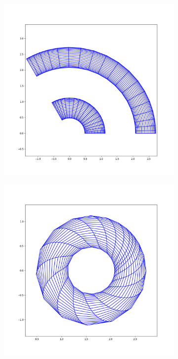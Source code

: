 \begin{figure}[H]
	\centering
	\begin{subfigure}[b]{0.4\textwidth}
		\centering
		\includegraphics[width=1\textwidth]{schemes/torturedGrid_r_phi_view.png}
		\label{fig:MMSModelTorturedTopView}
	\end{subfigure}
	\begin{subfigure}[b]{0.4\textwidth}
		\centering
		\includegraphics[width=1\textwidth]{schemes/torturedGrid_r_theta_view.png}

\end{subfigure}
\end{figure}
